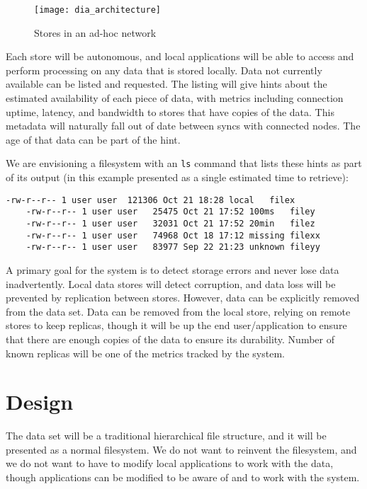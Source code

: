 \documentclass[12pt,a4paper,two-side]{book}
\begin{document}
\begin{figure}[h]
  \caption{Stores in an ad-hoc network}
  \label{fig:dia_architecture}
  \centering
    \texttt{[image: dia\_architecture]}
\end{figure}

Each store will be autonomous, and local applications will be able to access and
perform processing on any data that is stored locally. Data not currently
available can be listed and requested. The listing will give hints about the
estimated availability of each piece of data, with metrics including connection
uptime, latency, and bandwidth to stores that have copies of the data. This
metadata will naturally fall out of date between syncs with connected nodes. The
age of that data can be part of the hint.

We are envisioning a filesystem with an \lstinline{ls} command that lists these
hints as part of its output (in this example presented as a single estimated
time to retrieve):

\begin{lstlisting}[caption=Example ls output]
    -rw-r--r-- 1 user user  121306 Oct 21 18:28 local   filex
    -rw-r--r-- 1 user user   25475 Oct 21 17:52 100ms   filey
    -rw-r--r-- 1 user user   32031 Oct 21 17:52 20min   filez
    -rw-r--r-- 1 user user   74968 Oct 18 17:12 missing filexx
    -rw-r--r-- 1 user user   83977 Sep 22 21:23 unknown fileyy
\end{lstlisting}

A primary goal for the system is to detect storage errors and never lose data
inadvertently. Local data stores will detect corruption, and data loss will be
prevented by replication between stores. However, data can be explicitly removed
from the data set. Data can be removed from the local store, relying on remote
stores to keep replicas, though it will be up the end user/application to ensure
that there are enough copies of the data to ensure its durability. Number of
known replicas will be one of the metrics tracked by the system.









\chapter{Design}\label{design}

The data set will be a traditional hierarchical file structure, and it will be
presented as a normal filesystem. We do not want to reinvent the filesystem, and
we do not want to have to modify local applications to work with the data,
though applications can be modified to be aware of and to work with the system.
\end{document}
